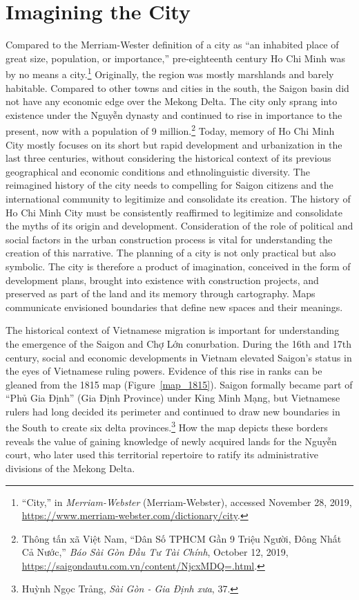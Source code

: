 \section{Imagining the City}
Compared to the Merriam-Wester definition of a city as “an inhabited place of great size, population, or importance,” pre-eighteenth century Ho Chi Minh was by no means a city.\footnote{“City,” in \textit{Merriam-Webster} (Merriam-Webster), accessed November 28, 2019, \url{https://www.merriam-webster.com/dictionary/city}.} Originally, the region was mostly marshlands and barely habitable. Compared to other towns and cities in the south, the Saigon basin did not have any economic edge over the Mekong Delta. The city only sprang into existence under the Nguyễn dynasty and continued to rise in importance to the present, now with a population of 9 million.\footnote{Thông tấn xã Việt Nam, “Dân Số TPHCM Gần 9 Triệu Người, Đông Nhất Cả Nước,” \textit{Báo Sài Gòn Đầu Tư Tài Chính}, October 12, 2019, \url{https://saigondautu.com.vn/content/NjcxMDQ=.html}.} Today, memory of Ho Chi Minh City mostly focuses on its short but rapid development and urbanization in the last three centuries, without considering the historical context of its previous geographical and economic conditions and ethnolinguistic diversity. The reimagined history of the city needs to compelling for Saigon citizens and the international community to legitimize and consolidate its creation. The history of Ho Chi Minh City must be consistently reaffirmed to legitimize and consolidate the myths of its origin and development. Consideration of the role of political and social factors in the urban construction process is vital for understanding the creation of this narrative. The planning of a city is not only practical but also symbolic. The city is therefore a product of imagination, conceived in the form of development plans, brought into existence with construction projects, and preserved as part of the land and its memory through cartography. Maps communicate envisioned boundaries that define new spaces and their meanings.

The historical context of Vietnamese migration is important for understanding the emergence of the Saigon and Chợ Lớn conurbation. During the 16th and 17th century, social and economic developments in Vietnam elevated Saigon’s status in the eyes of Vietnamese ruling powers. Evidence of this rise in ranks can be gleaned from the 1815 map (Figure~\ref{map_1815}). Saigon formally became part of “Phủ Gia Định” (Gia Định Province) under King Minh Mạng, but Vietnamese rulers had long decided its perimeter and continued to draw new boundaries in the South to create six delta provinces.\footnote{Huỳnh Ngọc Trảng, \textit{Sài Gòn - Gia Định xưa}, 37.} How the map depicts these borders reveals the value of gaining knowledge of newly acquired lands for the Nguyễn court, who later used this territorial repertoire to ratify its administrative divisions of the Mekong Delta.

